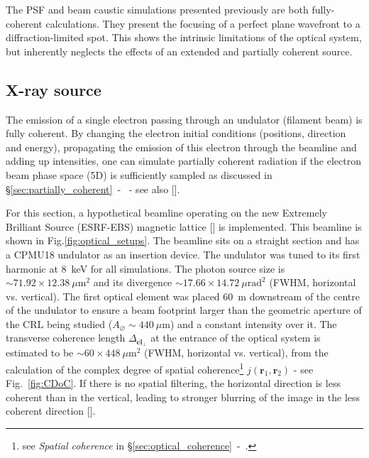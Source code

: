 \begin{refsection}
The PSF and beam caustic simulations presented previously are both fully-coherent calculations. They present the focusing of a perfect plane wavefront to a diffraction-limited spot. This shows the intrinsic limitations of the optical system, but inherently neglects the effects of an extended and partially coherent source.

\subsection{X-ray source}\label{sec:source_sim}
The emission of a single electron passing through an undulator (filament beam) is fully coherent. By changing the electron initial conditions (positions, direction and energy), propagating the emission of this electron through the beamline and adding up intensities, one can simulate partially coherent radiation if the electron beam phase space (5D) is sufficiently sampled as discussed in \S\ref{sec:partially_coherent}~-~\textit{} - see also [\cite{Chubar2011}]. 

For this section, a hypothetical beamline operating on the new Extremely Brilliant Source (ESRF-EBS) magnetic lattice [\cite{orangebook}] is implemented. This beamline is shown in Fig.\ref{fig:optical_setups}. The beamline sits on a straight section and has a CPMU18 undulator as an insertion device. The undulator was tuned to its first harmonic at 8~keV for all simulations. The photon source size is $\sim71.92\times12.38~\mu\text{m}^2$ and its divergence $\sim17.66\times14.72~\mu\text{rad}^2$ (FWHM, horizontal vs. vertical). The first optical element was placed 60~m downstream of the centre of the undulator to ensure a beam footprint larger than the geometric aperture of the CRL being studied ($A_{\diameter}\sim440~\mu\text{m}$) and a constant intensity over it. The transverse coherence length $\Delta_{\textbf{cl}_{\perp}}$ at the entrance of the optical system is estimated to be $\sim60\times448~\mu\text{m}^2$ (FWHM, horizontal vs. vertical), from the calculation of the complex degree of spatial coherence\footnote{see \textit{Spatial coherence} in \S\ref{sec:optical_coherence}~-~\textit{}.} $j(\textbf{r}_1,\textbf{r}_2)$ - see Fig.~\ref{fig:CDoC}. If there is no spatial filtering, the horizontal direction is less coherent than in the vertical, leading to stronger blurring of the image in the less coherent direction [\cite[\textit{\S7.5}]{Goodman2017}]. 


\end{refsection}
